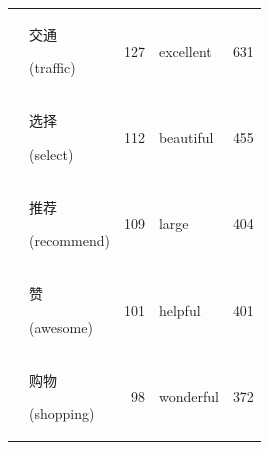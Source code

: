 \documentclass[smallextended,natbib]{svjour3}       %
\begin{document}
\begin{table}[ht]
{\begin{tabular}{|c|lr|lr|}
                                                             & \begin{CJK}{UTF8}{gbsn}交通\end{CJK} (traffic)         & 127   & excellent   & 631   \\  
                                                             & \begin{CJK}{UTF8}{gbsn}选择\end{CJK} (select)          & 112   & beautiful   & 455   \\  
                                                             & \begin{CJK}{UTF8}{gbsn}推荐\end{CJK} (recommend)       & 109   & large       & 404   \\  
                                                             & \begin{CJK}{UTF8}{gbsn}赞\end{CJK} (awesome)          & 101   & helpful     & 401   \\  
                                                             & \begin{CJK}{UTF8}{gbsn}购物\end{CJK} (shopping)        & 98    & wonderful   & 372   \\ \hline
        \end{tabular}%
        }
    \end{table}
\end{document}
